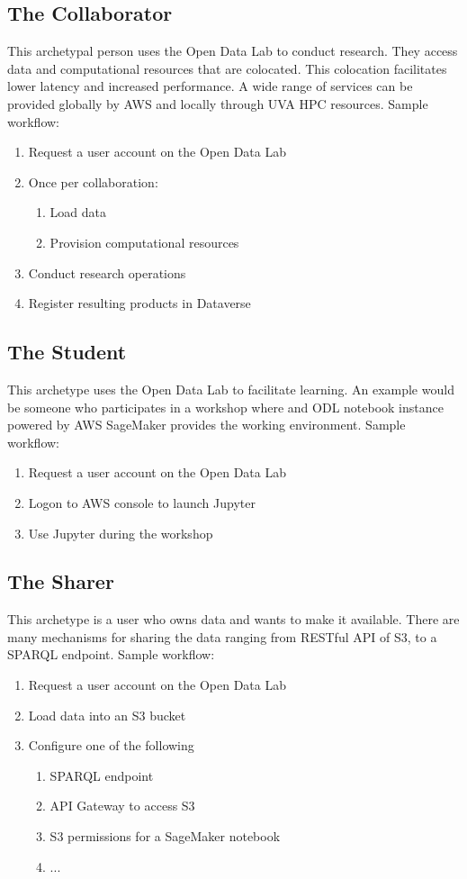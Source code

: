 \subsection*{The Collaborator}
This archetypal person uses the Open Data Lab to conduct research. They access data and computational resources that are colocated. This colocation facilitates lower latency and increased performance. A wide range of services can be provided globally by AWS and locally through UVA HPC resources. Sample workflow:
\begin{enumerate}
\item Request a user account on the Open Data Lab
\item Once per collaboration:
\begin{enumerate}
\item Load data 
\item Provision computational resources
\end{enumerate}
\item Conduct research operations
\item Register resulting products in Dataverse
\end{enumerate}

\subsection*{The Student}
This archetype uses the Open Data Lab to facilitate learning. An example would be someone who participates in a workshop where and ODL notebook instance powered by AWS SageMaker provides the working environment. Sample workflow:
\begin{enumerate}
\item Request a user account on the Open Data Lab
\item Logon to AWS console to launch Jupyter
\item Use Jupyter during the workshop
\end{enumerate}

\subsection*{The Sharer}
This archetype is a user who owns data and wants to make it available. There are many mechanisms for sharing the data ranging from RESTful API of S3, to a SPARQL endpoint. Sample workflow:
\begin{enumerate}
\item Request a user account on the Open Data Lab
\item Load data into an S3 bucket
\item Configure one of the following
\begin{enumerate}
\item SPARQL endpoint
\item API Gateway to access S3
\item S3 permissions for a SageMaker notebook
\item ...
\end{enumerate}
\end{enumerate}

